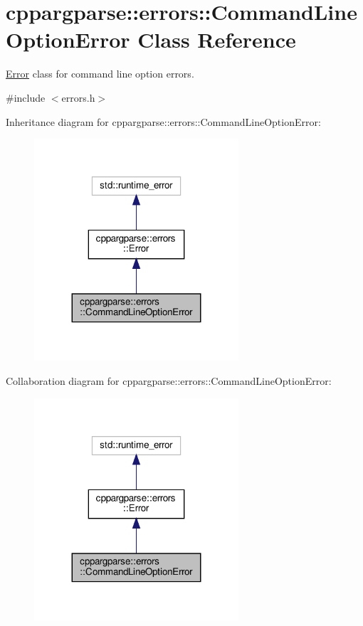 \hypertarget{classcppargparse_1_1errors_1_1CommandLineOptionError}{}\section{cppargparse\+:\+:errors\+:\+:Command\+Line\+Option\+Error Class Reference}
\label{classcppargparse_1_1errors_1_1CommandLineOptionError}


\hyperlink{classcppargparse_1_1errors_1_1Error}{Error} class for command line option errors.  




{\ttfamily \#include $<$errors.\+h$>$}



Inheritance diagram for cppargparse\+:\+:errors\+:\+:Command\+Line\+Option\+Error\+:
\nopagebreak
\begin{figure}[H]
\begin{center}
\leavevmode
\includegraphics[width=215pt]{classcppargparse_1_1errors_1_1CommandLineOptionError__inherit__graph}
\end{center}
\end{figure}


Collaboration diagram for cppargparse\+:\+:errors\+:\+:Command\+Line\+Option\+Error\+:
\nopagebreak
\begin{figure}[H]
\begin{center}
\leavevmode
\includegraphics[width=215pt]{classcppargparse_1_1errors_1_1CommandLineOptionError__coll__graph}
\end{center}
\end{figure}
